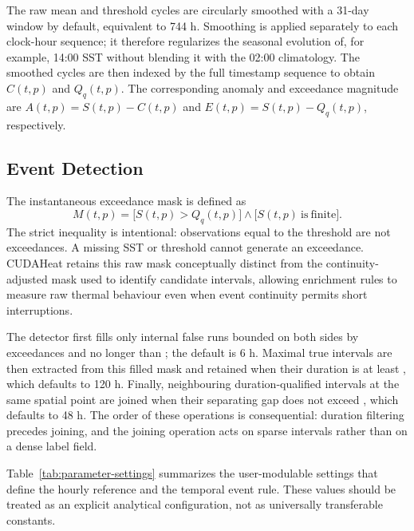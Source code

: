 The raw mean and threshold cycles are circularly smoothed with a 31-day window by default, equivalent to 744 h. Smoothing is applied separately to each clock-hour sequence; it therefore regularizes the seasonal evolution of, for example, 14:00 SST without blending it with the 02:00 climatology. The smoothed cycles are then indexed by the full timestamp sequence to obtain $C(t,p)$ and $Q_q(t,p)$. The corresponding anomaly and exceedance magnitude are $A(t,p)=S(t,p)-C(t,p)$ and $E(t,p)=S(t,p)-Q_q(t,p)$, respectively.

\subsection{Event Detection}



The instantaneous exceedance mask is defined as
\[
M(t,p)=\bigl[S(t,p)>Q_q(t,p)\bigr]\land\bigl[S(t,p)\ \mathrm{is\ finite}\bigr].
\]
The strict inequality is intentional: observations equal to the threshold are not exceedances. A missing SST or threshold cannot generate an exceedance. CUDAHeat retains this raw mask conceptually distinct from the continuity-adjusted mask used to identify candidate intervals, allowing enrichment rules to measure raw thermal behaviour even when event continuity permits short interruptions.



The detector first fills only internal false runs bounded on both sides by exceedances and no longer than ; the default is 6 h. Maximal true intervals are then extracted from this filled mask and retained when their duration is at least , which defaults to 120 h. Finally, neighbouring duration-qualified intervals at the same spatial point are joined when their separating gap does not exceed , which defaults to 48 h. The order of these operations is consequential: duration filtering precedes joining, and the joining operation acts on sparse intervals rather than on a dense label field.

Table~\ref{tab:parameter-settings} summarizes the user-modulable settings that define the hourly reference and the temporal event rule. These values should be treated as an explicit analytical configuration, not as universally transferable constants.

